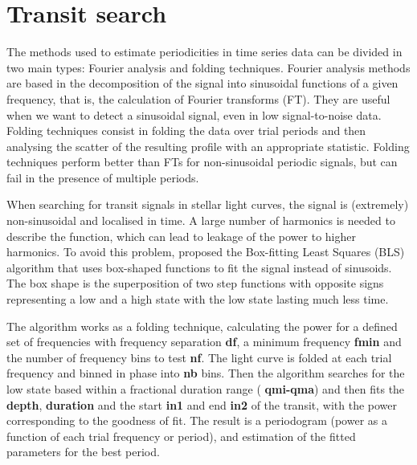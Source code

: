 \documentclass[12pt,twoside]{article}
\newcounter{problem}
\begin{document}
\section*{Transit search}


The methods used to estimate periodicities in time series data can be divided in two main types: Fourier analysis 
and folding techniques. 
Fourier analysis methods are based in the decomposition of the signal into sinusoidal functions of a given frequency, that is, the calculation of Fourier transforms (FT). They are useful when we want to detect a sinusoidal signal, even in low signal-to-noise data. Folding techniques consist in folding the data over trial periods and then analysing the scatter of the resulting profile with an appropriate statistic.
Folding techniques perform better than FTs for non-sinusoidal periodic signals, but can fail in the presence of multiple periods.

When searching for transit signals in stellar light curves, the signal is (extremely) non-sinusoidal and localised in time. A large number of harmonics is needed to describe the function, which can lead to leakage of the power to higher harmonics. To avoid this problem, \citet{Kovacs2002} proposed the Box-fitting Least Squares (BLS) algorithm that uses box-shaped functions to fit the signal instead of sinusoids. The box shape is the superposition of two step functions with opposite signs representing a low and a high state with the low state lasting much less time.
 
The algorithm works as a folding technique, calculating the power for a defined set of frequencies with frequency separation \textbf{df}, a minimum frequency \textbf{fmin} and the number of frequency bins to test \textbf{nf}. The light curve is folded at each trial frequency and binned in phase into \textbf{nb} bins. Then the algorithm searches for the low state based within a fractional duration range ( \textbf{qmi-qma}) and then fits the  \textbf{depth},  \textbf{duration} and the start \textbf{in1} and end \textbf{in2} of the transit, with the power corresponding to the goodness of fit. The result is a periodogram (power as a function of each trial frequency or period), and estimation of the fitted parameters for the best period.
 
\end{document}
